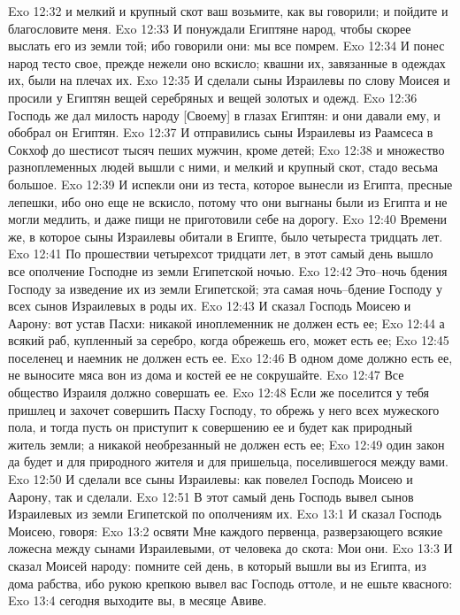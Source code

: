 Exo 12:32  и мелкий и крупный скот ваш возьмите, как вы говорили; и пойдите и благословите меня.
Exo 12:33  И понуждали Египтяне народ, чтобы скорее выслать его из земли той; ибо говорили они: мы все помрем.
Exo 12:34  И понес народ тесто свое, прежде нежели оно вскисло; квашни их, завязанные в одеждах их, были на плечах их.
Exo 12:35  И сделали сыны Израилевы по слову Моисея и просили у Египтян вещей серебряных и вещей золотых и одежд.
Exo 12:36  Господь же дал милость народу [Своему] в глазах Египтян: и они давали ему, и обобрал он Египтян.
Exo 12:37  И отправились сыны Израилевы из Раамсеса в Сокхоф до шестисот тысяч пеших мужчин, кроме детей;
Exo 12:38  и множество разноплеменных людей вышли с ними, и мелкий и крупный скот, стадо весьма большое.
Exo 12:39  И испекли они из теста, которое вынесли из Египта, пресные лепешки, ибо оно еще не вскисло, потому что они выгнаны были из Египта и не могли медлить, и даже пищи не приготовили себе на дорогу.
Exo 12:40  Времени же, в которое сыны Израилевы обитали в Египте, было четыреста тридцать лет.
Exo 12:41  По прошествии четырехсот тридцати лет, в этот самый день вышло все ополчение Господне из земли Египетской ночью.
Exo 12:42  Это--ночь бдения Господу за изведение их из земли Египетской; эта самая ночь--бдение Господу у всех сынов Израилевых в роды их.
Exo 12:43  И сказал Господь Моисею и Аарону: вот устав Пасхи: никакой иноплеменник не должен есть ее;
Exo 12:44  а всякий раб, купленный за серебро, когда обрежешь его, может есть ее;
Exo 12:45  поселенец и наемник не должен есть ее.
Exo 12:46  В одном доме должно есть ее, не выносите мяса вон из дома и костей ее не сокрушайте.
Exo 12:47  Все общество Израиля должно совершать ее.
Exo 12:48  Если же поселится у тебя пришлец и захочет совершить Пасху Господу, то обрежь у него всех мужеского пола, и тогда пусть он приступит к совершению ее и будет как природный житель земли; а никакой необрезанный не должен есть ее;
Exo 12:49  один закон да будет и для природного жителя и для пришельца, поселившегося между вами.
Exo 12:50  И сделали все сыны Израилевы: как повелел Господь Моисею и Аарону, так и сделали.
Exo 12:51  В этот самый день Господь вывел сынов Израилевых из земли Египетской по ополчениям их.
Exo 13:1  И сказал Господь Моисею, говоря:
Exo 13:2  освяти Мне каждого первенца, разверзающего всякие ложесна между сынами Израилевыми, от человека до скота: Мои они.
Exo 13:3  И сказал Моисей народу: помните сей день, в который вышли вы из Египта, из дома рабства, ибо рукою крепкою вывел вас Господь оттоле, и не ешьте квасного:
Exo 13:4  сегодня выходите вы, в месяце Авиве.
